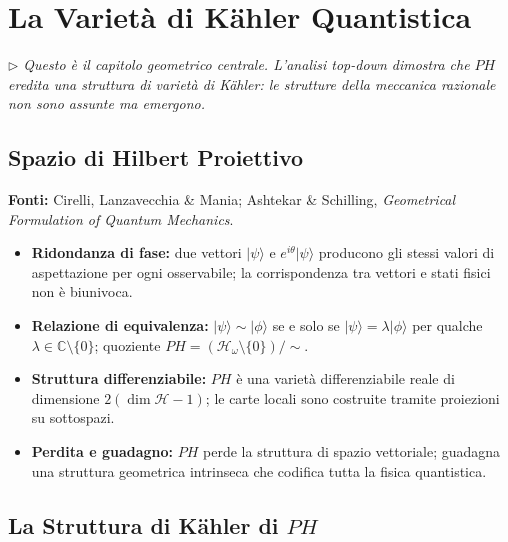 \documentclass[12pt, a4paper]{article}
\newcommand{\fonti}[1]{%
	\begin{fontebox}
		\textcolor{fontecolor}{\footnotesize\textbf{Fonti:} #1}
	\end{fontebox}%
}
\newcommand{\nota}[1]{%
	\par\smallskip
	\noindent\textit{\small $\triangleright$\; #1}
	\par\smallskip
}
\begin{document}
	\newpage
	\section{La Varietà di Kähler Quantistica}
	
	\nota{Questo è il capitolo geometrico centrale. L'analisi top-down dimostra che $PH$ eredita una struttura di varietà di Kähler: le strutture della meccanica razionale non sono assunte ma emergono.}
	
	\subsection{Spazio di Hilbert Proiettivo}
	
	\fonti{Cirelli, Lanzavecchia \& Mania; Ashtekar \& Schilling, \textit{Geometrical Formulation of Quantum Mechanics}.}
	
	\begin{itemize}
		\item \textbf{Ridondanza di fase:} due vettori $|\psi\rangle$ e $e^{i\theta}|\psi\rangle$ producono gli stessi valori di aspettazione per ogni osservabile; la corrispondenza tra vettori e stati fisici non è biunivoca.
		\item \textbf{Relazione di equivalenza:} $|\psi\rangle \sim |\phi\rangle$ se e solo se $|\psi\rangle = \lambda|\phi\rangle$ per qualche $\lambda \in \mathbb{C}\setminus\{0\}$; quoziente $PH = (\mathcal{H}_\omega \setminus \{0\})/{\sim}$.
		\item \textbf{Struttura differenziabile:} $PH$ è una varietà differenziabile reale di dimensione $2(\dim\mathcal{H}-1)$; le carte locali sono costruite tramite proiezioni su sottospazi.
		\item \textbf{Perdita e guadagno:} $PH$ perde la struttura di spazio vettoriale; guadagna una struttura geometrica intrinseca che codifica tutta la fisica quantistica.
	\end{itemize}
	
	\subsection{La Struttura di Kähler di $PH$}
	
\end{document}
